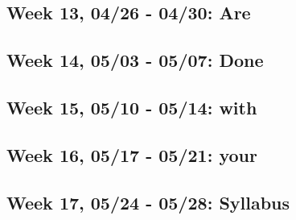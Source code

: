 \documentclass[]{article}
\begin{document}
\subsection{Week 13, 04/26 - 04/30: Are}\label{week-13-0426---0430-are}

\subsection{Week 14, 05/03 - 05/07:
Done}\label{week-14-0503---0507-done}

\subsection{Week 15, 05/10 - 05/14:
with}\label{week-15-0510---0514-with}

\subsection{Week 16, 05/17 - 05/21:
your}\label{week-16-0517---0521-your}

\subsection{Week 17, 05/24 - 05/28:
Syllabus}\label{week-17-0524---0528-syllabus}
\end{document}

